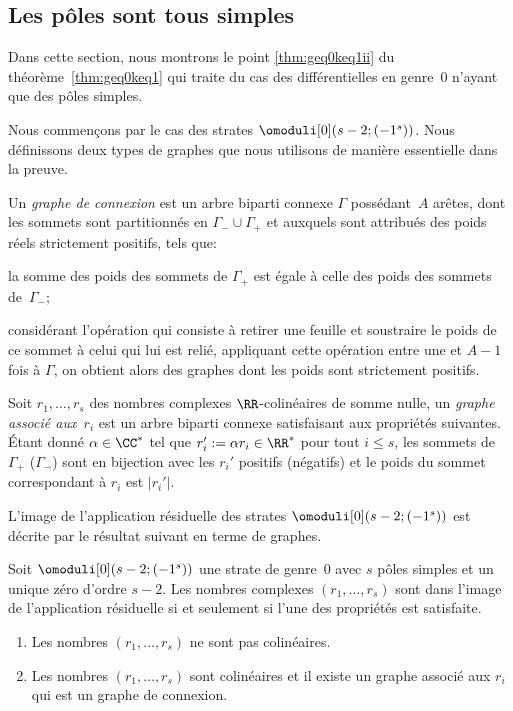 \subsection{Les pôles sont tous simples}
\label{sec:caslier}
Dans cette section, nous montrons le point \eqref{thm:geq0keq1ii} du théorème~\ref{thm:geq0keq1} qui traite du cas des différentielles en genre~$0$ n'ayant que des pôles simples.

Nous commençons par le cas des strates $\omoduli[0](s-2;(-1^{s}))$. Nous définissons deux types de graphes que nous utilisons de manière essentielle dans la preuve.

\begin{defn}\label{def:grapheconnexion}
Un \emph{graphe de connexion} est un arbre biparti connexe $\Gamma$ possédant~$A$ arêtes, dont les sommets sont partitionnés en $\Gamma_{-}\cup\Gamma_{+}$ et auxquels sont attribués des poids réels strictement positifs, tels que:
\begin{enumeratei}
\item\label{def:grapheconnexioni} la somme des poids des sommets de $\Gamma_{+}$ est égale à celle des poids des sommets de~$\Gamma_{-}$;
\item\label{def:grapheconnexionii} considérant l'opération qui consiste à retirer une feuille et soustraire le poids de ce sommet à celui qui lui est relié, appliquant cette opération entre une et $A-1$ fois à $\Gamma$, on obtient alors des graphes dont les poids sont strictement positifs.
\end{enumeratei}
\end{defn}

\begin{defn}
Soit $r_{1},\dots,r_{s}$ des nombres complexes $\RR$-colinéaires de somme nulle, un \emph{graphe associé aux~$r_{i}$} est un arbre biparti connexe satisfaisant aux propriétés suivantes. Étant donné $\alpha\in\CC^{\ast}$ tel que $r_{i}':=\alpha r_{i}\in\RR^{\ast}$ pour tout $i\leq s$, les sommets de $\Gamma_{+}$ (\resp $\Gamma_{-}$) sont en bijection avec les $r_{i}'$ positifs (\resp négatifs) et le poids du sommet correspondant à $r_{i}$ est $|r_{i}'|$.
\end{defn}

L'image de l'application résiduelle des strates $\omoduli[0](s-2;(-1^{s}))$ est décrite par le résultat suivant en terme de graphes.
\begin{lem}\label{lem:gzeropolesimples}
Soit $\omoduli[0](s-2;(-1^{s}))$ une strate de genre~$0$ avec $s$ pôles simples et un unique zéro d'ordre $s-2$. Les nombres complexes $(r_{1},\ldots,r_{s})$ sont dans l'image de l'application résiduelle si et seulement si
l'une des propriétés est satisfaite.
\begin{enumerate}
\item\label{lem:gzeropolesimples1} Les nombres $(r_{1},\ldots,r_{s})$ ne sont pas colinéaires.
\item\label{lem:gzeropolesimples2} Les nombres $(r_{1},\ldots,r_{s})$ sont colinéaires et il existe un graphe associé aux $r_{i}$ qui est un graphe de connexion.
\end{enumerate}
\end{lem}

